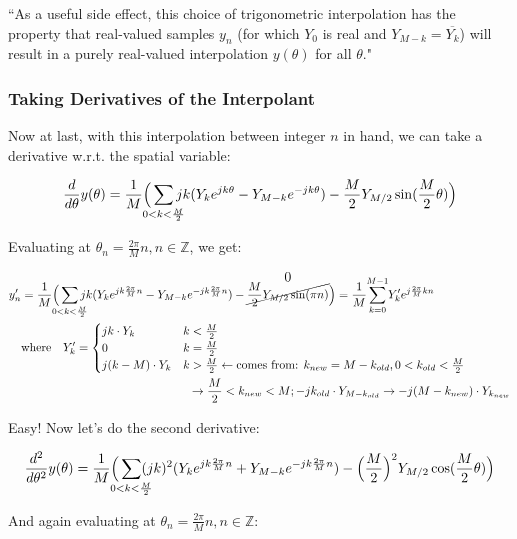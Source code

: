 \documentclass[10pt]{article}
\begin{document}
``As a useful side effect, this choice of trigonometric interpolation has the property that real-valued samples $y_n$ (for which $Y_0$ is real and $Y_{M-k} = \overline{Y_k}$) will result in a purely real-valued interpolation $y(\theta)$ for all $\theta$."

\subsubsection{Taking Derivatives of the Interpolant}

Now at last, with this interpolation between integer $n$ in hand, we can take a derivative w.r.t. the spatial variable:

$$\frac{d}{d\theta} y(\theta) = \frac{1}{M} \Big( \sum_{\mathclap{0 < k < \frac{M}{2}}} j k (Y_k e^{j k \theta} - Y_{M-k} e^{-j k \theta}) - \frac{M}{2} Y_{M/2} \sin(\frac{M}{2}\theta) \Big)$$

Evaluating at $\theta_n = \frac{2\pi}{M}n, n \in \mathbb{Z}$, we get:\vspace{-5mm}

\begin{align*}
y'_n &= \frac{1}{M} \Big( \sum_{\mathclap{0 < k < \frac{M}{2}}} j k (Y_k e^{j k \frac{2\pi}{M}n} - Y_{M-k} e^{-j k \frac{2\pi}{M}n}) - \overset{\text{\large 0}}{\cancel{\frac{M}{2} Y_{M/2} \sin(\pi n)}} \Big) = \frac{1}{M} \sum_{k = 0}^{\mathclap{M-1}} Y'_k e^{j\frac{2\pi}{M}kn} \\
& \text{where} \quad Y'_k = \begin{cases} j k \cdot Y_k & k < \frac{M}{2} \\ 0 & k = \frac{M}{2} \\ j(k - M) \cdot Y_k & k > \frac{M}{2} \leftarrow \text{comes from: } k_{new} = M - k_{old}, 0 < k_{old} < \frac{M}{2} \end{cases}\\ & \hspace{5cm} \rightarrow \frac{M}{2} < k_{new} < M; -jk_{old} \cdot Y_{M - k_{old}} \rightarrow -j(M - k_{new}) \cdot Y_{k_{new}}
\end{align*}

Easy! Now let's do the second derivative:

$$\frac{d^2}{d\theta^2} y(\theta) = \frac{1}{M} \Big( \sum_{\mathclap{0 < k < \frac{M}{2}}} (jk)^2 (Y_k e^{j k \frac{2\pi}{M}n} + Y_{M-k} e^{-j k \frac{2\pi}{M}n}) - \Big(\frac{M}{2}\Big)^2 Y_{M/2} \cos(\frac{M}{2}\theta) \Big)$$

And again evaluating at $\theta_n = \frac{2\pi}{M}n, n \in \mathbb{Z}$:\vspace{-5mm}
\end{document}

